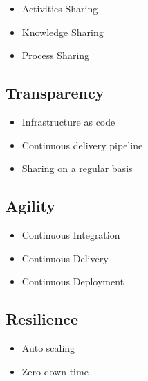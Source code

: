 \begin{itemize}
\item Activities Sharing
\item Knowledge Sharing
\item Process Sharing
\end{itemize}

\subsection{Transparency}

\begin{itemize}
\item Infrastructure as code
\item Continuous delivery pipeline
\item Sharing on a regular basis
\end{itemize}

\subsection{Agility}

\begin{itemize}
\item Continuous Integration
\item Continuous Delivery
\item Continuous Deployment
\end{itemize}

\subsection{Resilience}
\begin{itemize}
\item Auto scaling
\item Zero down-time
\end{itemize}
